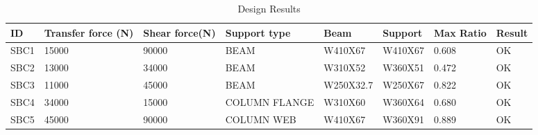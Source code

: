\newcommand{\cellwidth}{1.75cm}
\begin{table}[h]
\centering
\ttfamily
\begin{tabular}{m{\cellwidth}m{\cellwidth}m{\cellwidth}m{\cellwidth}m{\cellwidth}m{\cellwidth}m{\cellwidth}m{\cellwidth}}
ID &Transfer force (N) & Shear force(N) &Support type &Beam &Support &Max Ratio  &Result\\
\hline
SBC1
&15000
&90000
&BEAM
&W410X67
&W410X67
&   0.608 
&   OK                                                    \\
SBC2
&13000
&34000
&BEAM
&W310X52
&W360X51
&   0.472 
&   OK                                                    \\
SBC3
&11000
&45000
&BEAM
&W250X32.7
&W250X67
&   0.822 
&   OK                                                    \\
SBC4
&34000
&15000
&COLUMN FLANGE
&W310X60
&W360X64
&   0.680 
&   OK                                                    \\
SBC5
&45000
&90000
&COLUMN WEB
&W410X67
&W360X91
&   0.889 
&   OK                                                    \\
\hline
\end{tabular}
\caption{Design Results}
\label{tab:res_tab}
\end{table}

